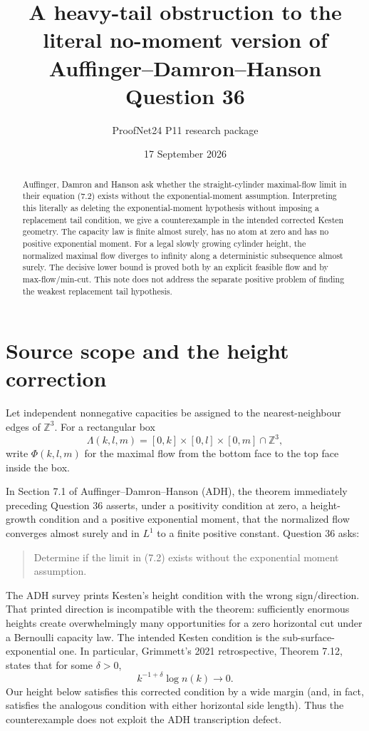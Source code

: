 \documentclass[11pt]{article}
\title{A heavy-tail obstruction to the literal no-moment version of\\
Auffinger--Damron--Hanson Question 36}
\author{ProofNet24 P11 research package}
\date{17 September 2026}
\begin{document}
\maketitle

\begin{abstract}
Auffinger, Damron and Hanson ask whether the straight-cylinder maximal-flow limit in their equation (7.2) exists without the exponential-moment assumption.  Interpreting this literally as deleting the exponential-moment hypothesis without imposing a replacement tail condition, we give a counterexample in the intended corrected Kesten geometry.  The capacity law is finite almost surely, has no atom at zero and has no positive exponential moment.  For a legal slowly growing cylinder height, the normalized maximal flow diverges to infinity along a deterministic subsequence almost surely.  The decisive lower bound is proved both by an explicit feasible flow and by max-flow/min-cut.  This note does not address the separate positive problem of finding the weakest replacement tail hypothesis.
\end{abstract}

\section{Source scope and the height correction}

Let independent nonnegative capacities be assigned to the nearest-neighbour edges of \(\mathbb Z^3\).  For a rectangular box
\[
  \Lambda(k,l,m)=[0,k]\times[0,l]\times[0,m]\cap\mathbb Z^3,
\]
write \(\Phi(k,l,m)\) for the maximal flow from the bottom face to the top face inside the box.

In Section 7.1 of Auffinger--Damron--Hanson (ADH), the theorem immediately preceding Question 36 asserts, under a positivity condition at zero, a height-growth condition and a positive exponential moment, that the normalized flow converges almost surely and in \(L^1\) to a finite positive constant.  Question 36 asks:

\begin{quote}
Determine if the limit in (7.2) exists without the exponential moment assumption.
\end{quote}

The ADH survey prints Kesten's height condition with the wrong sign/direction.  That printed direction is incompatible with the theorem: sufficiently enormous heights create overwhelmingly many opportunities for a zero horizontal cut under a Bernoulli capacity law.  The intended Kesten condition is the sub-surface-exponential one.  In particular, Grimmett's 2021 retrospective, Theorem 7.12, states that for some \(\delta>0\),
\[
  k^{-1+\delta}\log n(k)\longrightarrow0.
\]
Our height below satisfies this corrected condition by a wide margin (and, in fact, satisfies the analogous condition with either horizontal side length).  Thus the counterexample does not exploit the ADH transcription defect.
\end{document}
